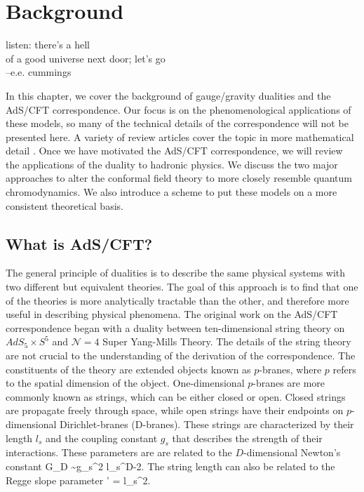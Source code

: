 \chapter{Background}
\label{background}

\begin{flushright}
 listen: there's a hell \\
of a good universe next door; let's go \\
--e.e. cummings
\end{flushright}

In this chapter, we cover the background of gauge/gravity dualities and the AdS/CFT correspondence.
Our focus is on the phenomenological applications of these models, so many of the technical details of the correspondence will not be presented here.
A variety of review articles cover the topic in more mathematical detail \cite{Ramallo2013,Zaffaroni2000,Kim2012,Erdmenger:2007cm,Edelstein:2009iv,KLEBANOV2006,Gubser2009}.
Once we have motivated the AdS/CFT correspondence, we will review the applications of the duality to hadronic physics. 
We discuss the two major approaches to alter the conformal field theory to more closely resemble quantum chromodynamics.
We also introduce a scheme to put these models on a more consistent theoretical basis.

\section{What is AdS/CFT?}
The general principle of dualities is to describe the same physical systems with two different but equivalent theories. 
The goal of this approach is to find that one of the theories is more analytically tractable than the other, and therefore more useful in describing physical phenomena.
The original work on the AdS/CFT correspondence began with a duality between ten-dimensional string theory on $AdS_5 \times S^5$ and $\mathcal{N}=4 $ Super Yang-Mills Theory.
The details of the string theory are not crucial to the understanding of the derivation of the correspondence.
The constituents of the theory are extended objects known as $p$-branes, where $p$ refers to the spatial dimension of the object. 
One-dimensional $p$-branes are more commonly known as strings, which can be either closed or open.
Closed strings are propagate freely through space, while open strings have  their endpoints on $p$-dimensional Dirichlet-branes (D-branes). 
These strings are characterized by their length $l_s$ and the coupling constant $g_s$ that describes the strength of their interactions. 
These parameters are are related to the $D$-dimensional Newton's constant
\be
G_D \sim g_s^2 l_s^{D-2}.
\ee
The string length can also be related to the Regge slope parameter
\be
\alpha' = l_s^2.
\label{eq:ReggeSlope}
\ee

